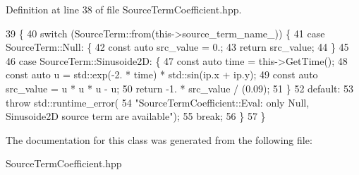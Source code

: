 Definition at line 38 of file Source\+Term\+Coefficient.\+hpp.


\begin{DoxyCode}
39                                                                    \{
40   \textcolor{keywordflow}{switch} (SourceTerm::from(this->source\_term\_name\_)) \{
41     \textcolor{keywordflow}{case} SourceTerm::Null: \{
42       \textcolor{keyword}{const} \textcolor{keyword}{auto} src\_value = 0.;
43       \textcolor{keywordflow}{return} src\_value;
44     \}
45 
46     \textcolor{keywordflow}{case} SourceTerm::Sinusoide2D: \{
47       \textcolor{keyword}{const} \textcolor{keyword}{auto} time = this->GetTime();
48       \textcolor{keyword}{const} \textcolor{keyword}{auto} u = std::exp(-2. * time) * std::sin(ip.x + ip.y);
49       \textcolor{keyword}{const} \textcolor{keyword}{auto} src\_value = u * u * u - u;
50       \textcolor{keywordflow}{return} -1. * src\_value / (0.09);
51     \}
52     \textcolor{keywordflow}{default}:
53       \textcolor{keywordflow}{throw} std::runtime\_error(
54           \textcolor{stringliteral}{"SourceTermCoefficient::Eval: only Null, Sinusoide2D source term are available"});
55       \textcolor{keywordflow}{break};
56   \}
57 \}
\end{DoxyCode}


The documentation for this class was generated from the following file\+:\begin{DoxyCompactItemize}
\item 
Source\+Term\+Coefficient.\+hpp\end{DoxyCompactItemize}
